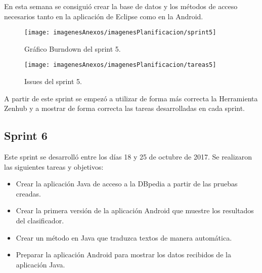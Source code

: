 En esta semana se consiguió crear la base de datos y los métodos de acceso necesarios tanto en la aplicación de Eclipse como en la Android.

\begin{figure}[h]
    \begin{center}%
        \begin{center}%
          \texttt{[image: imagenesAnexos/imagenesPlanificacion/sprint5]}%
          \caption{Gráfico Burndown del sprint 5.}%
          \label{figSprint5}%
        \end{center}%
  	\end{center}%
\end{figure}%

\begin{figure}[h]
    \begin{center}%
        \begin{center}%
          \texttt{[image: imagenesAnexos/imagenesPlanificacion/tareas5]}%
          \caption{Issues del sprint 5.}%
          \label{figTareas5}%
        \end{center}%
  	\end{center}%
\end{figure}%

\newpage

A partir de este sprint se empezó a utilizar de forma más correcta la Herramienta Zenhub y a mostrar de forma correcta las tareas desarrolladas en cada sprint.

\subsection{Sprint 6}

Este sprint se desarrolló entre los días 18 y 25 de octubre de 2017. Se realizaron las siguientes tareas y objetivos:

\begin{itemize}
	\item Crear la aplicación Java de acceso a la DBpedia a partir de las pruebas creadas.
	\item Crear la primera versión de la aplicación Android que muestre los resultados del clasificador.
	\item Crear un método en Java que traduzca textos de manera automática.
	\item Preparar la aplicación Android para mostrar los datos recibidos de la aplicación Java.
\end{itemize}

